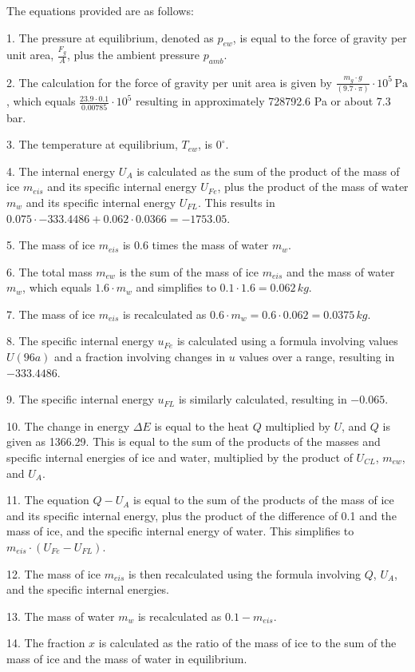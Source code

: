 The equations provided are as follows:

1. The pressure at equilibrium, denoted as \( p_{ew} \), is equal to the force of gravity per unit area, \( \frac{F_g}{A} \), plus the ambient pressure \( p_{amb} \).

2. The calculation for the force of gravity per unit area is given by \( \frac{m_g \cdot g}{(9.7 \cdot \pi)} \cdot 10^5 \, \text{Pa} \), which equals \( \frac{23.9 \cdot 0.1}{0.00785} \cdot 10^5 \) resulting in approximately 728792.6 Pa or about 7.3 bar.

3. The temperature at equilibrium, \( T_{ew} \), is \( 0^\circ \).

4. The internal energy \( U_A \) is calculated as the sum of the product of the mass of ice \( m_{eis} \) and its specific internal energy \( U_{Fe} \), plus the product of the mass of water \( m_w \) and its specific internal energy \( U_{FL} \). This results in \( 0.075 \cdot -333.4486 + 0.062 \cdot 0.0366 = -1753.05 \).

5. The mass of ice \( m_{eis} \) is 0.6 times the mass of water \( m_w \).

6. The total mass \( m_{ew} \) is the sum of the mass of ice \( m_{eis} \) and the mass of water \( m_w \), which equals \( 1.6 \cdot m_w \) and simplifies to \( 0.1 \cdot 1.6 = 0.062 \, kg \).

7. The mass of ice \( m_{eis} \) is recalculated as \( 0.6 \cdot m_w = 0.6 \cdot 0.062 = 0.0375 \, kg \).

8. The specific internal energy \( u_{Fe} \) is calculated using a formula involving values \( U(96a) \) and a fraction involving changes in \( u \) values over a range, resulting in \( -333.4486 \).

9. The specific internal energy \( u_{FL} \) is similarly calculated, resulting in \( -0.065 \).

10. The change in energy \( \Delta E \) is equal to the heat \( Q \) multiplied by \( U \), and \( Q \) is given as 1366.29. This is equal to the sum of the products of the masses and specific internal energies of ice and water, multiplied by the product of \( U_{CL} \), \( m_{ew} \), and \( U_{A} \).

11. The equation \( Q - U_A \) is equal to the sum of the products of the mass of ice and its specific internal energy, plus the product of the difference of 0.1 and the mass of ice, and the specific internal energy of water. This simplifies to \( m_{eis} \cdot (U_{Fe} - U_{FL}) \).

12. The mass of ice \( m_{eis} \) is then recalculated using the formula involving \( Q \), \( U_A \), and the specific internal energies.

13. The mass of water \( m_w \) is recalculated as \( 0.1 - m_{eis} \).

14. The fraction \( x \) is calculated as the ratio of the mass of ice to the sum of the mass of ice and the mass of water in equilibrium.